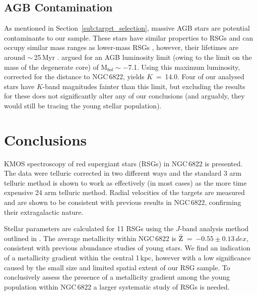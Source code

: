 
\subsection{AGB Contamination} %
\label{sub:AGB_contamination}
As mentioned in Section~\ref{sub:target_selection}, massive AGB stars are potential contaminants to our sample.
These stars have similar properties to RSGs and can occupy similar mass ranges as lower-mass RSGs
\citep{2005ARA&A..43..435H},
however, their lifetimes are around $\sim$\,25\,Myr
\citep{2010MNRAS.401.1453D}.
\cite{1983ApJ...272...99W} argued for an AGB luminosity limit
(owing to the limit on the mass of the degenerate core) of M$_{bol}\sim -$7.1.
Using this maximum luminosity, corrected for the distance to NGC\,6822,
yields $K$~=~14.0.
Four of our analysed stars have $K$-band magnitudes fainter than this limit,
but excluding the results for these does not significantly alter any of our conclusions
(and arguably, they would still be tracing the young stellar population).


\section{Conclusions} %
\label{sec:ngc6822conc}

KMOS spectroscopy of red supergiant stars (RSGs) in NGC\,6822 is presented.
The data were telluric corrected in two different ways and the standard 3 arm telluric method is shown to work as effectively (in most cases) as the more time expensive 24 arm telluric method.
Radial velocities of the targets are measured and are shown to be consistent with previous results in NGC\,6822, confirming their extragalactic nature.

Stellar parameters are calculated for 11 RSGs using the $J$-band analysis method outlined in
\cite{2010MNRAS.407.1203D}.
The average metallicity within NGC\,6822 is
$\bar{\rm Z}$~=~$-0.55\pm0.13\,dex$,
consistent with previous abundance studies of young stars.
We find an indication of a metallicity gradient within the central 1\,kpc,
however with a low significance caused by the small size and limited spatial extent of our RSG sample.
To conclusively assess the presence of a metallicity gradient among the young population within NGC\,6822 a larger systematic study of RSGs is needed.

